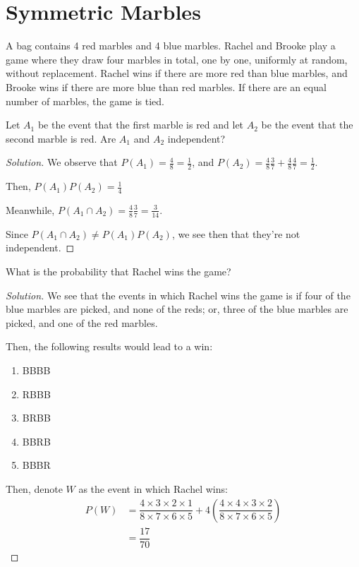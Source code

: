 \documentclass{article}
\newenvironment{solution}{\begin{proof}[Solution]}{\end{proof}}
\begin{document}
\section{Symmetric Marbles}
A bag contains 4 red marbles and 4 blue marbles. Rachel and Brooke play a game where they draw four marbles in total, one by one, uniformly at random, without replacement. Rachel wins if there are more red than blue marbles, and Brooke wins if there are more blue than red marbles. If there are an equal number of marbles, the game is tied.
\begin{hw}
	Let $A_1$ be the event that the first marble is red and let $A_2$ be the event that the second marble is red. Are $A_1$ and $A_2$ independent?
\end{hw}
\begin{solution}
	We observe that $P(A_{1}) = \frac{4}{8} = \frac{1}{2}$, and $P(A_{2}) = \frac{4}{8}\frac{3}{7} + \frac{4}{8}\frac{4}{7} = \frac{1}{2}$.
	
	Then, $P(A_{1})P(A_{2}) = \frac{1}{4}$
	
	Meanwhile, $P(A_{1} \cap A_{2}) = \frac{4}{8}\frac{3}{7} = \frac{3}{14}$.
	
	Since $P(A_{1} \cap A_{2}) \not= P(A_{1})P(A_{2})$, we see then that they're not independent.
\end{solution}

\begin{hw}
	What is the probability that Rachel wins the game?
\end{hw}
\begin{solution}
	We see that the events in which Rachel wins the game is if four of the blue marbles are picked, and none of the reds; or, three of the blue marbles are picked, and one of the red marbles.
	
	Then, the following results would lead to a win:
	\begin{enumerate}
		\item BBBB
		\item RBBB
		\item BRBB
		\item BBRB
		\item BBBR
	\end{enumerate}
	
	Then, denote $W$ as the event in which Rachel wins:
	\begin{align*}
		P(W) &= \dfrac{4 \times 3 \times 2 \times 1}{8 \times 7 \times 6 \times 5} + 4\left( \dfrac{4 \times 4 \times 3 \times 2}{8 \times 7 \times 6 \times 5} \right) \\
		&= \dfrac{17}{70}
	\end{align*}
\end{solution}
\end{document}
